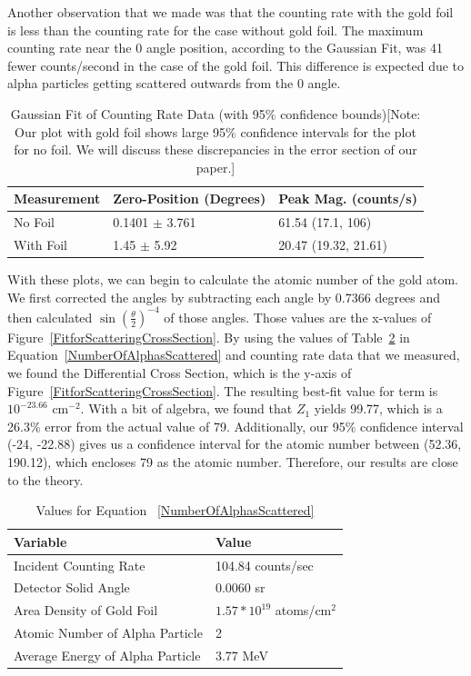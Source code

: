 Another observation that we made was that the counting rate with the gold foil is less than the counting rate for the case without gold foil. The maximum counting rate near the 0 angle position, according to the Gaussian Fit, was 41 fewer counts/second in the case of the gold foil. This difference is expected due to alpha particles getting scattered outwards from the 0 angle. 

\begin{table}[h] 
  \begin{tabular}{|l|l|l|}
  \hline
  Measurement & Zero-Position (Degrees) & Peak Mag. (counts/s) \\ \hline \hline
  No Foil     & 0.1401 $\pm$ 3.761  & 61.54  (17.1, 106)   \\ 
  With Foil   & 1.45 $\pm$ 5.92 & 20.47  (19.32, 21.61) \\ \hline     
  \end{tabular}
  \caption{Gaussian Fit of Counting Rate Data (with 95$\%$ confidence bounds)[\footnotesize{Note: Our plot with gold foil shows large 95$\%$ confidence intervals for the plot for no foil. We will discuss these discrepancies in the error section of our paper.}]}
  \label{ZeroPosition}
\end{table}

With these plots, we can begin to calculate the atomic number of the gold atom. We first corrected the angles by subtracting each angle by 0.7366 degrees and then calculated $ \sin(\frac{\theta}{2})^{-4}$ of those angles. Those values are the x-values of Figure~\ref{FitforScatteringCrossSection}. By using the values of Table~\ref{Values} in Equation~\ref{NumberOfAlphasScattered} and counting rate data that we measured, we found the Differential Cross Section, which is the y-axis of Figure~\ref{FitforScatteringCrossSection}. The resulting best-fit value for term is $10^{-23.66}$ cm$^{-2}$. With a bit of algebra, we found that $Z_1$ yields 99.77, which is a 26.3$\%$ error from the actual value of 79. Additionally, our 95$\%$ confidence interval (-24, -22.88) gives us a confidence interval for the atomic number between (52.36, 190.12), which encloses 79 as the atomic number. Therefore, our results are close to the theory.

\begin{table}[h]
  \begin{tabular}{|l|l|}
  \hline 
  Variable                         & Value               \\ \hline \hline 
  Incident Counting Rate           & 104.84 counts/sec   \\
  Detector Solid Angle             & 0.0060 sr           \\
  Area Density of Gold Foil        & $1.57 * 10^{19}$ atoms/cm$^2$ \\
  Atomic Number of Alpha Particle  & 2                   \\
  Average Energy of Alpha Particle & 3.77 MeV        \\ \hline
  \end{tabular}
  \caption{Values for Equation ~\ref{NumberOfAlphasScattered}}
  \label{Values}
\end{table}

